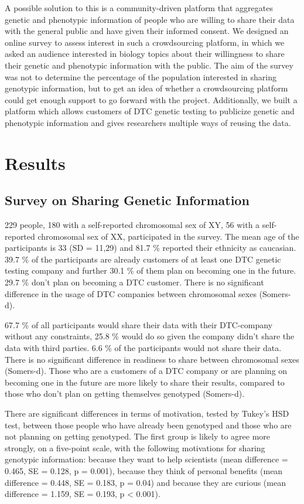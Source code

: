 \documentclass[10pt]{article}
\begin{document}
A possible solution to this is a community-driven platform that aggregates genetic and phenotypic information of people who are willing to share their data with the general public and have given their informed consent. We designed an online survey to assess interest in such a crowdsourcing platform, in which we asked an audience interested in biology topics about their willingness to share their genetic and phenotypic information with the public. The aim of the survey was not to determine the percentage of the population interested in sharing genotypic information, but to get an idea of whether a crowdsourcing platform could get enough support to go forward with the project. Additionally, we built a platform which allows customers of DTC genetic testing to publicize genetic and phenotypic information and gives researchers multiple ways of reusing the data. 

\section*{Results}

\subsection*{Survey on Sharing Genetic Information}
229 people, 180 with a self-reported chromosomal sex of XY, 56 with a self-reported chromosomal sex of XX, participated in the survey. The mean age of the participants is 33 (SD = 11,29) and 81.7 \% reported their ethnicity as caucasian. 39.7 \% of the participants are already customers of at least one DTC genetic testing company and further 30.1 \% of them plan on becoming one in the future. 29.7 \% don't plan on becoming a DTC customer. There is no significant difference in the usage of DTC companies between chromosomal sexes (Somers-d). 

67.7 \% of all participants would share their data with their DTC-company without any constraints, 25.8 \% would do so given the company didn't share the data with third parties. 6.6 \% of the participants would not share their data. There is no significant difference in readiness to share between chromosomal sexes (Somers-d). Those who are a customers of a DTC company or are planning on becoming one in the future are more likely to share their results, compared to those who don't plan on getting themselves genotyped (Somers-d). 

There are significant differences in terms of motivation, tested by Tukey's HSD test, between those people who have already been genotyped and those who are not planning on getting genotyped. The first group is likely to agree more strongly, on a five-point scale, with the following motivations for sharing genotypic information: because they want to help scientists (mean difference = 0.465, SE = 0.128, p = 0.001), because they think of personal benefits (mean difference = 0.448, SE = 0.183, p = 0.04) and because they are curious (mean difference = 1.159, SE = 0.193, p < 0.001). 
\end{document}
